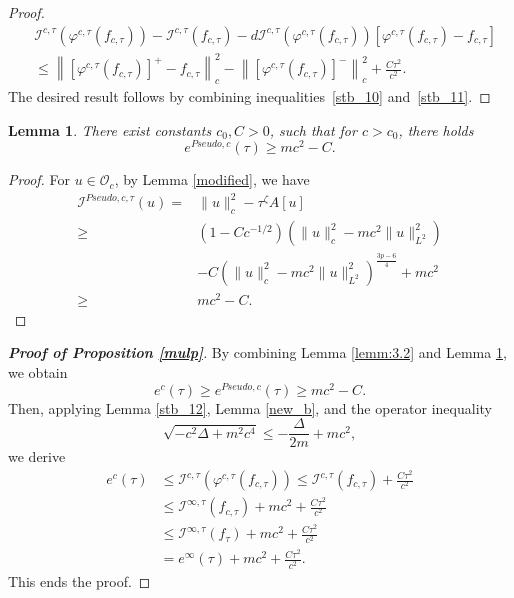 \documentclass{amsart}
\theoremstyle{plain}
\newtheorem{lemma}[theorem]{Lemma}
\theoremstyle{definition}
\theoremstyle{remark}
\numberwithin{equation}{section} \numberwithin{figure}{section}
\begin{document}
\begin{proof}
            \begin{equation}\label{stb_10}
            \begin{aligned}
            &\mathcal{I}^{c,\tau}(\varphi^{c,\tau}(f_{c, \tau})) - \mathcal{I}^{c,\tau}(f_{c,\tau}) - d\mathcal{I}^{c,\tau}(\varphi^{c,\tau}(f_{c, \tau}))[\varphi^{c,\tau}(f_{c, \tau}) - f_{c,\tau}] \\
            &\leq \left\| \left[\varphi^{c,\tau}(f_{c, \tau})\right]^+ - f_{c,\tau} \right\|_c^2 - \left\| \left[\varphi^{c,\tau}(f_{c, \tau})\right]^- \right\|_c^2 + \frac{C\tau^2}{c^2}.
            \end{aligned}
            \end{equation}            
            The desired result follows by combining inequalities~\eqref{stb_10} and~\eqref{stb_11}.
            \end{proof}
          


\begin{lemma}\label{pseudo}
    There exist constants $c_0, C>0$, such that for $c>c_0$, there holds $$e^{Pseudo,c}(\tau)\geq mc^2-C.$$
\end{lemma}
\begin{proof}
    For $u\in \mathcal{O}_c$, by Lemma \ref{modified}, we have
\begin{equation*}
    \begin{split}
        \mathcal{I}^{Pseudo,c, \tau}(u)= & \| u\|_{c}^2 - \tau^{\zeta} A[u]\\
         \geqslant& (1- Cc^{-1/2}) (\| u\|_{c}^2- mc^2\|u\|_{L^2}^2 )
        \\
        &-C \left(\|u\|_c^2 - mc^2\|u\|_{L^2}^2 \right)^{\frac{3p-6}{4}}
        + mc^2\\
        \geqslant& mc^2 - C.
    \end{split}
\end{equation*}
\end{proof}

\begin{proof}[\textbf{Proof of Proposition  \ref{mulp}}]
  By combining Lemma \ref{lemm:3.2} and Lemma \ref{pseudo}, we obtain
  \[
  e^c(\tau) \geq e^{{Pseudo},c}(\tau) \geq m c^2 - C.
  \]  
  Then, applying Lemma \ref{stb_12}, Lemma \ref{new_b}, and the operator inequality
  \[
  \sqrt{-c^2\Delta + m^2 c^4} \leq -\frac{\Delta}{2m} + m c^2,
  \]
  we derive
  \begin{equation}\label{0q}
  \begin{split}
  e^c(\tau) 
  &\leq \mathcal{I}^{c,\tau}(\varphi^{c,\tau}(f_{c,\tau})) 
  \leq \mathcal{I}^{c,\tau}(f_{c,\tau}) + \frac{C \tau^2}{c^2} \\
  &\leq \mathcal{I}^{\infty,\tau}(f_{c,\tau}) + m c^2 + \frac{C \tau^2}{c^2} \\
  &\leq \mathcal{I}^{\infty,\tau}(f_{\tau}) + m c^2 + \frac{C \tau^2}{c^2} \\
  &= e^\infty(\tau) + m c^2 + \frac{C \tau^2}{c^2}.
  \end{split}
  \end{equation}
  This ends the proof.
  \end{proof}
\end{document}
